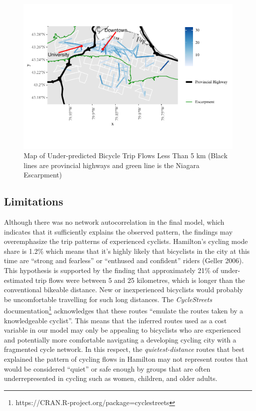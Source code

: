 \documentclass[smallextended]{svjour3}       %
\begin{document}
\begin{figure}
\centering
\includegraphics{BE-correlates-cycling-flows_files/figure-latex/residuals-under-5km-1.pdf}
\caption{\label{fig:residuals-under-5km} Map of Under-predicted Bicycle
Trip Flows Less Than 5 km (Black lines are provincial highways and green
line is the Niagara Escarpment)}
\end{figure}

\hypertarget{limitations}{%
\subsection{Limitations}\label{limitations}}

Although there was no network autocorrelation in the final model, which
indicates that it sufficiently explains the observed pattern, the
findings may overemphasize the trip patterns of experienced cyclists.
Hamilton's cycling mode share is 1.2\% which means that it's highly
likely that bicyclists in the city at this time are ``strong and
fearless'' or ``enthused and confident'' riders (Geller 2006). This
hypothesis is supported by the finding that approximately 21\% of
under-estimated trip flows were between 5 and 25 kilometres, which is
longer than the conventional bikeable distance. New or inexperienced
bicyclists would probably be uncomfortable travelling for such long
distances. The \emph{CycleStreets}
documentation\footnote{https://CRAN.R-project.org/package=cyclestreets}
acknowledges that these routes ``emulate the routes taken by a
knowledgeable cyclist''. This means that the inferred routes used as a
cost variable in our model may only be appealing to bicyclists who are
experienced and potentially more comfortable navigating a developing
cycling city with a fragmented cycle network. In this respect, the
\emph{quietest-distance} routes that best explained the pattern of
cycling flows in Hamilton may not represent routes that would be
considered ``quiet'' or safe enough by groups that are often
underrepresented in cycling such as women, children, and older adults.
\end{document}
